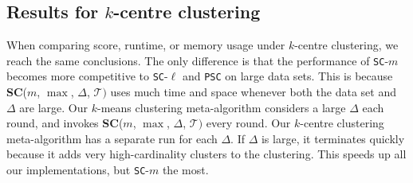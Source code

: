 \documentclass[11pt]{article}
\newcommand{\pathlets}{clusters\xspace}
\begin{document}
\subsection{Results for $k$-centre clustering}
When comparing score, runtime, or memory usage under $k$-centre clustering, we reach the same conclusions. 
The only difference is that  the performance of \texttt{SC}-$m$ becomes more competitive to \texttt{SC}-$\ell$ and \texttt{PSC} on large data sets. 
This is because \textbf{SC}($m$,  $\max$, $\Delta$, $\mathcal{T})$ uses much time and space whenever both the data set and $\Delta$ are large. 
Our $k$-means clustering meta-algorithm considers a large $\Delta$ each round, and invokes \textbf{SC}($m$,  $\max$, $\Delta$, $\mathcal{T})$ every round.
%
%
Our $k$-centre clustering meta-algorithm has a separate run for each $\Delta$. If $\Delta$ is large, it terminates quickly because it adds very high-cardinality \pathlets to the clustering. 
This speeds up all our implementations, but \texttt{SC}-$m$ the most. 
%
%
%
\end{document}
